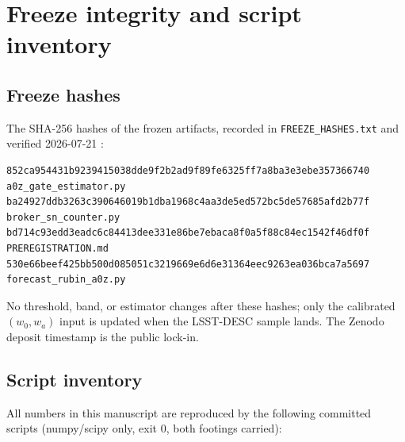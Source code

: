 \documentclass[11pt,a4paper]{article}
\begin{document}
\appendix

\section{Freeze integrity and script inventory}
\label{app:scripts}

\subsection*{Freeze hashes}

The SHA-256 hashes of the frozen artifacts, recorded in
\texttt{FREEZE\_HASHES.txt} and verified 2026-07-21 \cite{Zprereg}:

{\small
\begin{verbatim}
852ca954431b9239415038dde9f2b2ad9f89fe6325ff7a8ba3e3ebe357366740  a0z_gate_estimator.py
ba24927ddb3263c390646019b1dba1968c4aa3de5ed572bc5de57685afd2b77f  broker_sn_counter.py
bd714c93edd3eadc6c84413dee331e86be7ebaca8f0a5f88c84ec1542f46df0f  PREREGISTRATION.md
530e66beef425bb500d085051c3219669e6d6e31364eec9263ea036bca7a5697  forecast_rubin_a0z.py
\end{verbatim}
}

\noindent No threshold, band, or estimator changes after these hashes; only
the calibrated $(w_0,w_a)$ input is updated when the LSST-DESC sample lands.
The Zenodo deposit timestamp \cite{Zprereg} is the public lock-in.

\subsection*{Script inventory}

All numbers in this manuscript are reproduced by the following committed
scripts (numpy/scipy only, exit 0, both footings carried):
\end{document}
